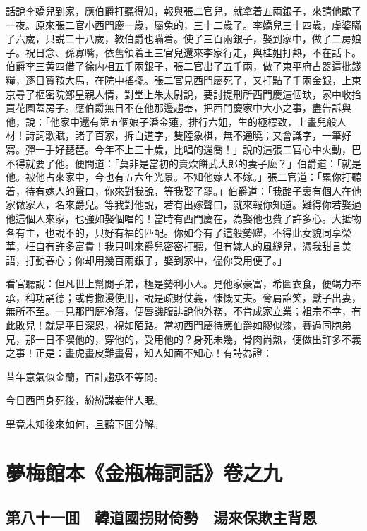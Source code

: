 話說李嬌兒到家，應伯爵打聽得知，報與張二官兒，就拿着五兩銀子，來請他歇了一夜。原來張二官小西門慶一歲，屬兔的，三十二歲了。李嬌兒三十四歲，虔婆瞞了六歲，只説二十八歲，教伯爵也瞞着。使了三百兩銀子，娶到家中，做了二房娘子。祝日念、孫寡嘴，依舊領着王三官兒還來李家行走，與桂姐打熱，不在話下。伯爵李三黄四借了徐内相五千兩銀子，張二官出了五千兩，做了東平府古器這批錢糧，逐日寳鞍大馬，在院中搖擺。張二官見西門慶死了，又打點了千兩金銀，上東京尋了樞密院鄭皇親人情，對堂上朱太尉說，要討提刑所西門慶這個缺，家中收拾買花園蓋房子。應伯爵無日不在他那邊趨奉，把西門慶家中大小之事，盡告訴與他，說：「他家中還有第五個娘子潘金蓮，排行六姐，生的極標致，上畫兒般人材！詩詞歌賦，諸子百家，拆白道字，雙陸象棋，無不通曉；又會識字，一筆好寫。彈一手好琵琶。今年不上三十歲，比唱的還喬！」說的這張二官心中火動，巴不得就要了他。便問道：「莫非是當初的賣炊餅武大郎的妻子麽？」伯爵道：「就是他。被他占來家中，今也有五六年光景。不知他嫁人不嫁。」張二官道：「累你打聽着，待有嫁人的聲口，你來對我說，等我娶了罷。」伯爵道：「我酩子裏有個人在他家做家人，名來爵兒。等我對他說，若有出嫁聲口，就來報你知道。難得你若娶過他這個人來家，也強如娶個唱的！當時有西門慶在，為娶他也費了許多心。大抵物各有主，也說不的，只好有福的匹配。你如今有了這般勢耀，不得此女貌同享榮華，枉自有許多富貴！我只叫來爵兒密密打聽，但有嫁人的風縫兒，憑我甜言羙語，打動春心；你却用幾百兩銀子，娶到家中，儘你受用便了。」

看官聽說：但凡世上幫閒子弟，極是勢利小人。見他家豪富，希圖衣食，便竭力奉承，稱功誦德；或肯撒漫使用，說是疏財仗義，慷慨丈夫。脅肩諂笑，獻子出妻，無所不至。一見那門庭冷落，便唇譏腹誹說他外務，不肯成家立業；祖宗不幸，有此敗兒！就是平日深恩，視如陌路。當初西門慶待應伯爵如膠似漆，賽過同胞弟兄，那一日不喫他的，穿他的，受用他的？身死未幾，骨肉尚熱，便做出許多不義之事！正是：畫虎畫皮難畫骨，知人知面不知心！有詩為證：

昔年意氣似金蘭，百計趨承不等閒。

今日西門身死後，紛紛謀妾伴人眠。

畢竟未知後來如何，且聽下囬分解。

\part*{夢梅館本《金瓶梅詞話》卷之九}

\chapter*{第八十一囬　韓道國拐財倚勢　湯來保欺主背恩}

